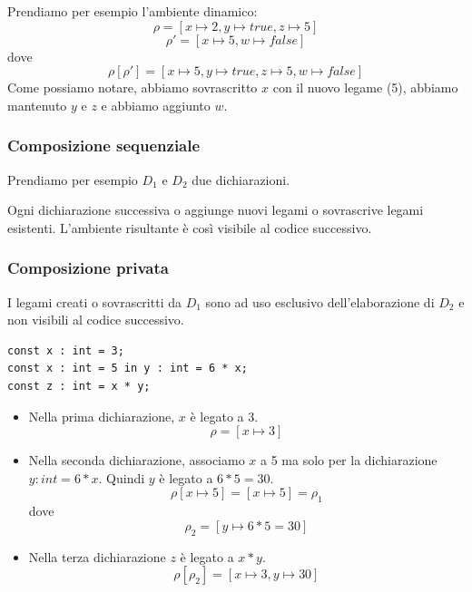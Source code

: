 \documentclass[a4paper]{article}
\begin{document}
\begin{Example}{}{}
Prendiamo per esempio l'ambiente dinamico:
\[
\rho = [x \mapsto 2, y \mapsto true, z \mapsto 5]
\]
\[
  \rho' = [x \mapsto 5, w \mapsto false]
\]
dove
\[
  \rho[\rho'] = [x \mapsto 5, y \mapsto true, z \mapsto 5, w \mapsto false]
\]
Come possiamo notare, abbiamo sovrascritto $x$ con il nuovo legame (5), abbiamo mantenuto $y$ e $z$ e abbiamo aggiunto $w$.
\end{Example}

\subsubsection{Composizione sequenziale}

Prendiamo per esempio $D_1$ e $D_2$ due dichiarazioni.

\noindent
Ogni dichiarazione successiva o aggiunge nuovi legami o 
sovrascrive legami esistenti. L'ambiente risultante è così 
visibile al codice successivo. 

\subsubsection{Composizione privata}

I legami creati o sovrascritti da $D_1$ sono ad uso esclusivo dell'elaborazione 
di $D_2$ e non visibili al codice successivo.
\begin{Example}{}{} 
\begin{lstlisting}
const x : int = 3; 
const x : int = 5 in y : int = 6 * x; 
const z : int = x * y;
\end{lstlisting}
\begin{itemize}
  \item Nella prima dichiarazione, $x$ è legato a 3.
  \[
    \rho = [x \mapsto 3]
  \]
  \item Nella seconda dichiarazione, associamo $x$ a 5 ma solo per 
  la dichiarazione $y : int = 6 * x$. 
  Quindi $y$ è legato a $6 * 5 = 30$.
  \[
    \rho[x \mapsto 5] = [x \mapsto 5] = \rho_1
  \]
  dove 
  \[
    \rho_2 = [y \mapsto 6 * 5 = 30]
  \]
  \item Nella terza dichiarazione $z$ è legato a $x * y$.
  \[
    \rho[\rho_2] = [x \mapsto 3, y \mapsto 30]
  \]
\end{itemize}
\end{Example}
\end{document}
